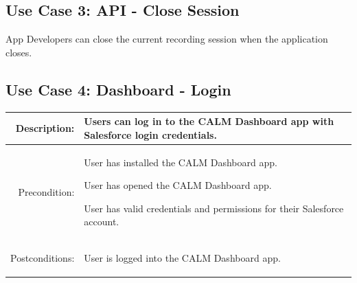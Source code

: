 \documentclass[12pt,oneside,letterpaper]{article}
\newenvironment{packed_enumerate}{ %
\vspace{-7mm}
\begin{enumerate}
  \setlength{\itemsep}{0pt}
  \setlength{\parskip}{0pt}
  \setlength{\parsep}{0pt}
}{\end{enumerate}
\vspace{-8mm}}
\begin{document}
\subsection{\label{APIClose}Use Case 3: API - Close Session}
App Developers can close the current recording session when the application 
closes.\\

\subsection{\label{DashboardLogin}Use Case 4: Dashboard - Login}
\begin{longtable}{|r|p{3.8in}|}
\hline
Description:&Users can log in to the CALM Dashboard app with Salesforce 
login credentials.\\
\hline
Precondition:&
\begin{packed_enumerate}
\item User has installed the CALM Dashboard app.
\item User has opened the CALM Dashboard app.
\item User has valid credentials and permissions for their Salesforce 
account.
\end{packed_enumerate}\\
\hline
Postconditions:&
\begin{packed_enumerate}
\item User is logged into the CALM Dashboard app.
\end{packed_enumerate}\\
\hline
\end{longtable}

\end{document}
